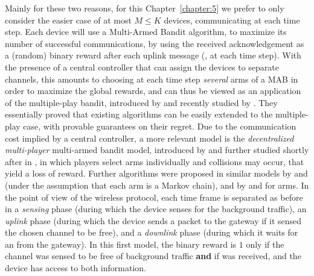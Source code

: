 Mainly for these two reasons, for this Chapter~\ref{chapter:5} we prefer to only consider the easier case of at most $M \leq K$ devices, communicating at each time step.
Each device will use a Multi-Armed Bandit algorithm, to maximize its number of successful communications, by using the received acknowledgement \Ack{} as a (random) binary reward after each uplink message (\ie, at each time step).
%
With the presence of a central controller that can assign the devices to separate channels, this amounts to choosing at each time step \emph{several} arms of a MAB in order to maximize the global rewards, and can thus be viewed as an application of the multiple-play bandit, introduced by \cite{Anantharam87a} and recently studied by \cite{Komiyama15}.
They essentially proved that existing algorithms can be easily extended to the multiple-play case, with provable guarantees on their regret.
%
%
Due to the communication cost implied by a central controller, a more relevant model is the
\emph{decentralized multi-player} multi-armed bandit model, introduced by \cite{Zhao10} and further studied shortly after in \cite{Anandkumar10,Anandkumar11}, in which players select arms individually and collisions may occur, that yield a loss of reward.
Further algorithms were proposed in similar models by \cite{Tekin12IEEE} and \cite{Kalathil12} (under the assumption that each arm is a Markov chain),
and by \cite{Avner15,Avner16} and \cite{Rosenski16} for \iid{} arms.
%
In the point of view of the wireless protocol, each time frame is separated as before in a \emph{sensing} phase (during which the device senses for the background traffic),
an \emph{uplink} phase (during which the device sends a packet to the gateway if it sensed the chosen channel to be free),
and a \emph{downlink} phase (during which it waits for an \Ack{} from the gateway).
In this first model, the binary reward is $1$ only if the channel was sensed to be free of background traffic \textbf{and} if \Ack{} was received, and the device has access to both information.

